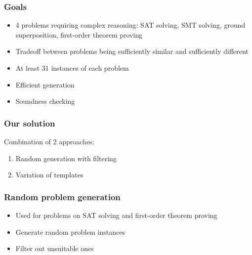 \documentclass[xcolor={table}]{beamer}
\begin{document}


\begin{frame}
\frametitle{Goals}
\begin{itemize}
\item 4 problems requiring complex reasoning:
  SAT solving, SMT solving, ground superposition, first-order theorem proving
\item Tradeoff between problems being sufficiently similar and sufficiently different
\item At least 31 instances of each problem
\item Efficient generation
\item Soundness checking
\end{itemize}
\end{frame}



\begin{frame}
\frametitle{Our solution}
Combination of 2 approaches:
\begin{enumerate}
\item Random generation with filtering
\item Variation of templates
\end{enumerate}
\end{frame}



\begin{frame}
\frametitle{Random problem generation}
\begin{itemize}
\item Used for problems on SAT solving and first-order theorem proving
\item Generate random problem instances
\item Filter out unsuitable ones
\end{itemize}
\end{frame}


\end{document}
